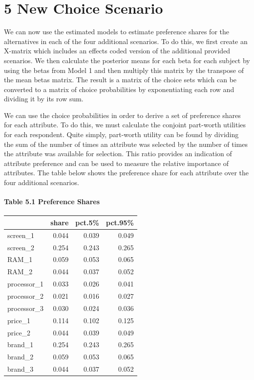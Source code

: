 \documentclass[]{article}
\let\oldparagraph\paragraph
\renewcommand{\paragraph}[1]{\oldparagraph{#1}\mbox{}}
\begin{document}
\section{5 New Choice Scenario}\label{new-choice-scenario}

We can now use the estimated models to estimate preference shares for
the alternatives in each of the four additional scenarios. To do this,
we first create an X-matrix which includes an effects coded version of
the additional provided scenarios. We then calculate the posterior means
for each beta for each subject by using the betas from Model 1 and then
multiply this matrix by the transpose of the mean betas matrix. The
result is a matrix of the choice sets which can be converted to a matrix
of choice probabilities by exponentiating each row and dividing it by
its row sum.

We can use the choice probabilities in order to derive a set of
preference shares for each attribute. To do this, we must calculate the
conjoint part-worth utilities for each respondent. Quite simply,
part-worth utility can be found by dividing the sum of the number of
times an attribute was selected by the number of times the attribute was
available for selection. This ratio provides an indication of attribute
preference and can be used to measure the relative importance of
attributes. The table below shows the preference share for each
attribute over the four additional scenarios.

\newpage

\paragraph{Table 5.1 Preference
Shares}\label{table-5.1-preference-shares}

\begin{longtable}[]{@{}lrrr@{}}
\toprule
& share & pct.5\% & pct.95\%\tabularnewline
\midrule
\endhead
screen\_1 & 0.044 & 0.039 & 0.049\tabularnewline
screen\_2 & 0.254 & 0.243 & 0.265\tabularnewline
RAM\_1 & 0.059 & 0.053 & 0.065\tabularnewline
RAM\_2 & 0.044 & 0.037 & 0.052\tabularnewline
processor\_1 & 0.033 & 0.026 & 0.041\tabularnewline
processor\_2 & 0.021 & 0.016 & 0.027\tabularnewline
processor\_3 & 0.030 & 0.024 & 0.036\tabularnewline
price\_1 & 0.114 & 0.102 & 0.125\tabularnewline
price\_2 & 0.044 & 0.039 & 0.049\tabularnewline
brand\_1 & 0.254 & 0.243 & 0.265\tabularnewline
brand\_2 & 0.059 & 0.053 & 0.065\tabularnewline
brand\_3 & 0.044 & 0.037 & 0.052\tabularnewline
\bottomrule
\end{longtable}
\end{document}
